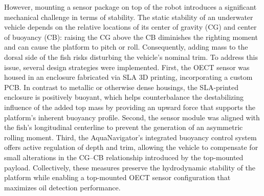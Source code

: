 \documentclass{iopjournal}
\begin{document}
However, mounting a sensor package on top of the robot introduces a significant mechanical challenge in terms of stability. The static stability of an underwater vehicle depends on the relative locations of its center of gravity (CG) and center of buoyancy (CB): raising the CG above the CB diminishes the righting moment and can cause the platform to pitch or roll. Consequently, adding mass to the dorsal side of the fish risks disturbing the vehicle’s nominal trim.
To address this issue, several design strategies were implemented. First, the OECT sensor was housed in an enclosure fabricated via SLA 3D printing, incorporating a custom PCB. In contrast to metallic or otherwise dense housings, the SLA-printed enclosure is positively buoyant, which helps counterbalance the destabilizing influence of the added top mass by providing an upward force that supports the platform’s inherent buoyancy profile. Second, the sensor module was aligned with the fish’s longitudinal centerline to prevent the generation of an asymmetric rolling moment. Third, the AquaNavigator’s integrated buoyancy control system \cite{Masood2023} offers active regulation of depth and trim, allowing the vehicle to compensate for small alterations in the CG–CB relationship introduced by the top-mounted payload. Collectively, these measures preserve the hydrodynamic stability of the platform while enabling a top-mounted OECT sensor configuration that maximizes oil detection performance.
\end{document}
